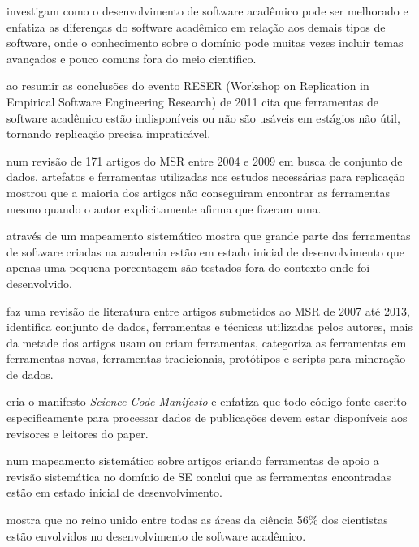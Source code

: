 investigam como o desenvolvimento de software acadêmico pode ser melhorado e
enfatiza as diferenças do software acadêmico em relação aos demais tipos de
software, onde o conhecimento sobre o domínio pode muitas vezes incluir temas
avançados e pouco comuns fora do meio científico.

ao resumir as conclusões do evento RESER (Workshop on Replication in Empirical
Software Engineering Research) de 2011 cita que ferramentas de software
acadêmico estão indisponíveis ou não são usáveis em estágios não útil, tornando
replicação precisa impraticável.

 num revisão de 171 artigos do MSR entre 2004 e 2009
em busca de conjunto de dados, artefatos e ferramentas utilizadas nos estudos
necessárias para replicação mostrou que a maioria dos artigos não conseguiram encontrar
as ferramentas mesmo quando o autor explicitamente afirma que fizeram uma.


através de um mapeamento sistemático mostra que grande parte das ferramentas de
software criadas na academia estão em estado inicial de desenvolvimento que
apenas uma pequena porcentagem são testados fora do contexto onde foi
desenvolvido. 

faz uma revisão de literatura entre artigos submetidos ao MSR de 2007 até 2013,
identifica conjunto de dados, ferramentas e técnicas utilizadas pelos autores,
mais da metade dos artigos usam ou criam ferramentas, categoriza as ferramentas
em ferramentas novas, ferramentas tradicionais, protótipos e scripts para
mineração de dados.

cria o manifesto {\it Science Code Manifesto} e enfatiza que todo código fonte
escrito especificamente para processar dados de publicações devem estar
disponíveis aos revisores e leitores do paper.

 num mapeamento sistemático sobre artigos criando
ferramentas de apoio a revisão sistemática no domínio de SE conclui que as
ferramentas encontradas estão em estado inicial de desenvolvimento.

 mostra que no reino unido entre todas as áreas da
ciência 56\% dos cientistas estão envolvidos no desenvolvimento de software
acadêmico.

